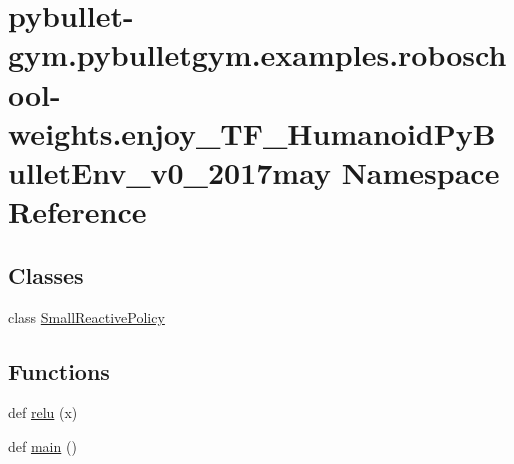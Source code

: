 \hypertarget{namespacepybullet-gym_1_1pybulletgym_1_1examples_1_1roboschool-weights_1_1enjoy___t_f___humanoid_py_bullet_env__v0__2017may}{}\section{pybullet-\/gym.pybulletgym.\+examples.\+roboschool-\/weights.enjoy\+\_\+\+T\+F\+\_\+\+Humanoid\+Py\+Bullet\+Env\+\_\+v0\+\_\+2017may Namespace Reference}
\label{namespacepybullet-gym_1_1pybulletgym_1_1examples_1_1roboschool-weights_1_1enjoy___t_f___humanoid_py_bullet_env__v0__2017may}
\subsection*{Classes}
\begin{DoxyCompactItemize}
\item 
class \hyperlink{classpybullet-gym_1_1pybulletgym_1_1examples_1_1roboschool-weights_1_1enjoy___t_f___humanoid_py_79806ff756929c49e7ea88bc9022bb3a}{Small\+Reactive\+Policy}
\end{DoxyCompactItemize}
\subsection*{Functions}
\begin{DoxyCompactItemize}
\item 
def \hyperlink{namespacepybullet-gym_1_1pybulletgym_1_1examples_1_1roboschool-weights_1_1enjoy___t_f___humanoid_py_bullet_env__v0__2017may_a4cf9df39ddb60a9791a8f7b66e362810}{relu} (x)
\item 
def \hyperlink{namespacepybullet-gym_1_1pybulletgym_1_1examples_1_1roboschool-weights_1_1enjoy___t_f___humanoid_py_bullet_env__v0__2017may_a1675a764ecdee8c6f26096bf1ccef469}{main} ()
\end{DoxyCompactItemize}
